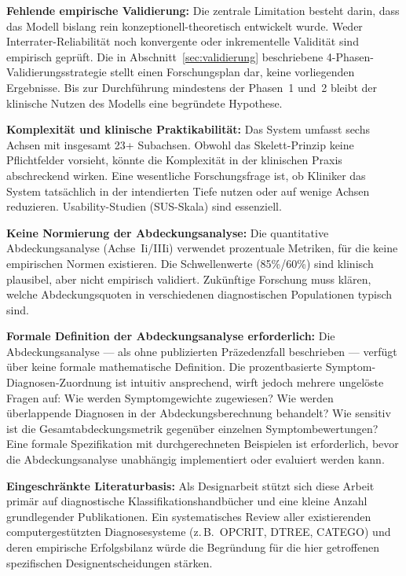 \documentclass[11pt,a4paper]{article}
\begin{document}
\textbf{Fehlende empirische Validierung:} Die zentrale Limitation besteht darin, dass das Modell bislang rein konzeptionell-theoretisch entwickelt wurde. Weder Interrater-Reliabilit\"at noch konvergente oder inkrementelle Validit\"at sind empirisch gepr\"uft. Die in Abschnitt~\ref{sec:validierung} beschriebene 4-Phasen-Validierungsstrategie stellt einen Forschungsplan dar, keine vorliegenden Ergebnisse. Bis zur Durchf\"uhrung mindestens der Phasen~1 und~2 bleibt der klinische Nutzen des Modells eine begr\"undete Hypothese.

\textbf{Komplexit\"at und klinische Praktikabilit\"at:} Das System umfasst sechs Achsen mit insgesamt 23+ Subachsen. Obwohl das Skelett-Prinzip keine Pflichtfelder vorsieht, k\"onnte die Komplexit\"at in der klinischen Praxis abschreckend wirken. Eine wesentliche Forschungsfrage ist, ob Kliniker das System tats\"achlich in der intendierten Tiefe nutzen oder auf wenige Achsen reduzieren. Usability-Studien (SUS-Skala) sind essenziell.

\textbf{Keine Normierung der Abdeckungsanalyse:} Die quantitative Abdeckungsanalyse (Achse~Ii/IIIi) verwendet prozentuale Metriken, f\"ur die keine empirischen Normen existieren. Die Schwellenwerte (85\%/60\%) sind klinisch plausibel, aber nicht empirisch validiert. Zuk\"unftige Forschung muss kl\"aren, welche Abdeckungsquoten in verschiedenen diagnostischen Populationen typisch sind.

\textbf{Formale Definition der Abdeckungsanalyse erforderlich:} Die Abdeckungsanalyse --- als \glqq ohne publizierten Pr\"azedenzfall\grqq{} beschrieben --- verf\"ugt \"uber keine formale mathematische Definition. Die prozentbasierte Symptom-Diagnosen-Zuordnung ist intuitiv ansprechend, wirft jedoch mehrere ungel\"oste Fragen auf: Wie werden Symptomgewichte zugewiesen? Wie werden \"uberlappende Diagnosen in der Abdeckungsberechnung behandelt? Wie sensitiv ist die Gesamtabdeckungsmetrik gegen\"uber einzelnen Symptombewertungen? Eine formale Spezifikation mit durchgerechneten Beispielen ist erforderlich, bevor die Abdeckungsanalyse unabh\"angig implementiert oder evaluiert werden kann.

\textbf{Eingeschr\"ankte Literaturbasis:} Als Designarbeit st\"utzt sich diese Arbeit prim\"ar auf diagnostische Klassifikationshandb\"ucher und eine kleine Anzahl grundlegender Publikationen. Ein systematisches Review aller existierenden computergest\"utzten Diagnosesysteme (z.\,B.\ OPCRIT, DTREE, CATEGO) und deren empirische Erfolgsbilanz w\"urde die Begr\"undung f\"ur die hier getroffenen spezifischen Designentscheidungen st\"arken.
\end{document}
